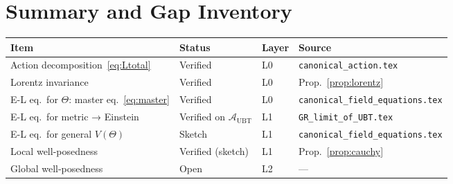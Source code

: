\documentclass[11pt,a4paper]{article}
\theoremstyle{definition}
\theoremstyle{remark}
\begin{document}
\section{Summary and Gap Inventory}\label{sec:summary}

\begin{center}
\begin{longtable}{llll}
\toprule
Item & Status & Layer & Source \\
\midrule
Action decomposition~\eqref{eq:Ltotal} & Verified & L0 &
  \texttt{canonical\_action.tex} \\
Lorentz invariance & Verified & L0 &
  Prop.~\ref{prop:lorentz} \\
E-L eq.\ for $\Theta$: master eq.~\eqref{eq:master} & Verified & L0 &
  \texttt{canonical\_field\_equations.tex} \\
E-L eq.\ for metric → Einstein & Verified on $\mathcal{A}_{\mathrm{UBT}}$ & L1 &
  \texttt{GR\_limit\_of\_UBT.tex} \\
E-L eq.\ for general $V(\Theta)$ & Sketch & L1 &
  \texttt{canonical\_field\_equations.tex} \\
Local well-posedness & Verified (sketch) & L1 &
  Prop.~\ref{prop:cauchy} \\
Global well-posedness & Open & L2 & — \\
\bottomrule
\end{longtable}
\end{center}
\end{document}
